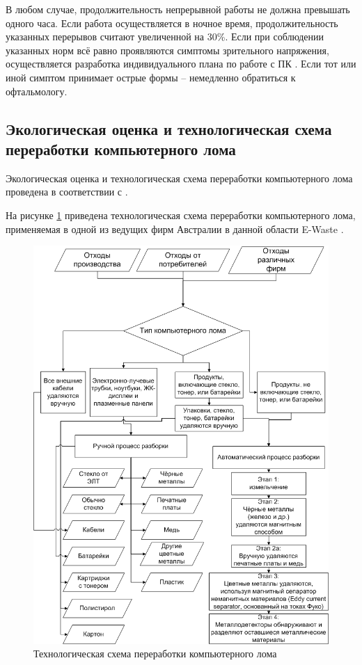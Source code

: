 В любом случае, продолжительность непрерывной работы не должна превышать одного часа. Если работа осуществляется в ночное время, продолжительность указанных перерывов считают увеличенной на 30\%. Если при соблюдении указанных норм всё равно проявляются симптомы зрительного напряжения, осуществляется разработка индивидуального плана по работе с ПК \cite{SANPIN}. Если тот или иной симптом принимает острые формы – немедленно обратиться к офтальмологу.

\subsection {Экологическая оценка и технологическая схема переработки компьютерного лома}
Экологическая оценка и технологическая схема переработки компьютерного лома проведена в соответствии с \cite {EWASTE, SNIP, ECOLOGY}.

На рисунке \ref{fig:garbageflow} приведена технологическая схема переработки компьютерного лома, применяемая в одной из ведущих фирм Австралии в данной области E-Waste \cite {EWASTE}. 
\begin {figure}[h!]
	\centering
	\includegraphics[scale=0.6]{img/ComputerGarbage.png}
	\caption{Технологическая схема переработки компьютерного лома}
	\label{fig:garbageflow}
\end {figure}

